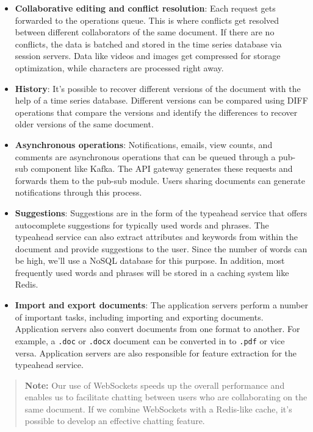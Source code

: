 \begin{itemize}
\item
\protect{}\label{iZMfwLl_zVgg29X038g_r}
\textbf{Collaborative editing and conflict resolution}: Each request gets forwarded to the operations queue. This is where conflicts get resolved between different collaborators of the same document. If there are no conflicts, the data is batched and stored in the time series database via session servers. Data like videos and images get compressed for storage optimization, while characters are processed right away.
\item
\protect{}\label{2V8zwEmspq76vWdFemg5e}
\textbf{History}: It's possible to recover different versions of the document with the help of a time series database. Different versions can be compared using DIFF operations that compare the versions and identify the differences to recover older versions of the same document.
\item
\protect{}\label{mnHxI3Tc1Q3cY_ihnTufr}
\textbf{Asynchronous operations}: Notifications, emails, view counts, and comments are asynchronous operations that can be queued through a pub-sub component like Kafka. The API gateway generates these requests and forwards them to the pub-sub module. Users sharing documents can generate notifications through this process.
\item
\protect{}\label{iB0aq5bxZijrnF5jGJkiU}
\textbf{Suggestions}: Suggestions are in the form of the typeahead service that offers autocomplete suggestions for typically used words and phrases. The typeahead service can also extract attributes and keywords from within the document and provide suggestions to the user. Since the number of words can be high, we'll use a NoSQL database for this purpose. In addition, most frequently used words and phrases will be stored in a caching system like Redis.
\item
\protect{}\label{Ia900ADvAN2SHFqWzsFZh}
\textbf{Import and export documents}: The application servers perform a number of important tasks, including importing and exporting documents. Application servers also convert documents from one format to another. For example, a \texttt{.doc} or \texttt{.docx} document can be converted in to \texttt{.pdf} or vice versa. Application servers are also responsible for feature extraction for the typeahead service.
\end{itemize}
\begin{quote}
\textbf{Note:} Our use of WebSockets speeds up the overall performance and enables us to facilitate chatting between users who are collaborating on the same document. If we combine WebSockets with a Redis-like cache, it's possible to develop an effective chatting feature.
\end{quote}

